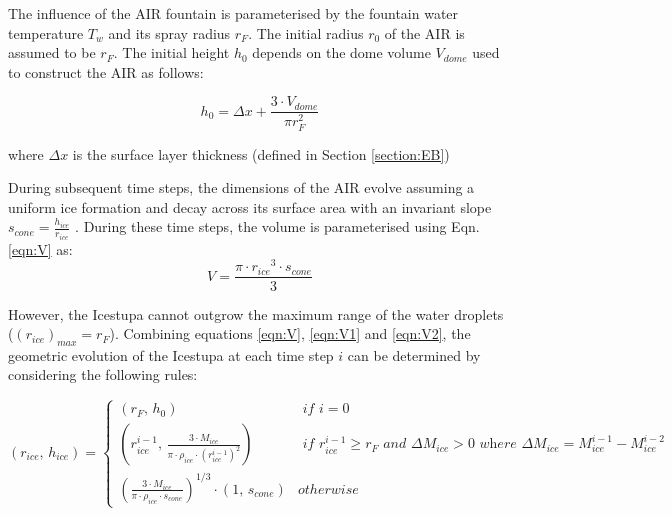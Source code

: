 \documentclass[utf8]{frontiersSCNS} %
\begin{document}
The influence of the AIR fountain is parameterised by the fountain water temperature $T_w$ and its spray radius $r_F$.
The initial radius $r_0$ of the AIR is assumed to be $r_F$. The initial height $h_0$ depends on the dome volume
$V_{dome}$ used to construct the AIR as follows:

\begin{equation} 
    h_{0} =  \Delta x + \frac{3 \cdot V_{dome}}{\pi r_F^2 } 
  \end{equation}

where $\Delta x$ is the surface layer thickness (defined in Section \ref{section:EB})

During subsequent time steps, the dimensions of the AIR evolve assuming a uniform ice formation and decay across
its surface area with an invariant slope $s_{cone} = \frac{h_{ice}}{r_{ice}}$ .  During
these time steps, the volume is parameterised using Eqn. \ref{eqn:V} as:\begin{equation} V = \frac{\pi \cdot {r_{ice}}^3
    \cdot s_{cone}}{3} \label{eqn:V2} \end{equation} 


However, the Icestupa cannot outgrow the maximum range of the water droplets ($(r_{ice})_{max} = r_{F}$). Combining
equations \ref{eqn:V}, \ref{eqn:V1} and \ref{eqn:V2}, the geometric evolution of the Icestupa at each time step $i$ can
be determined by considering the following rules:

\begin{equation} (r_{ice},\, h_{ice}) = \left\{ \begin{array}{ll} (r_F ,\, h_0) & \textit{ if } i=0\\
    (r_{ice}^{i-1},\, \frac{3 \cdot M_{ice}}{\pi \cdot \rho_{ice} \cdot {(r_{ice}^{i-1})}^2}) & \textit{ if }
    r_{ice}^{i-1} \geq r_{F} \textit{ and } \Delta M_{ice} > 0 \textit{ where } \Delta M_{ice} = M_{ice}^{i-1} -
    M_{ice}^{i-2}\\ (\frac{3 \cdot M_{ice}}{\pi \cdot \rho_{ice} \cdot s_{cone}})^{1/3} \cdot (1,\,  s_{cone}) &
otherwise \end{array} \right.  \label{eqn:A2} \end{equation}
\end{document}
